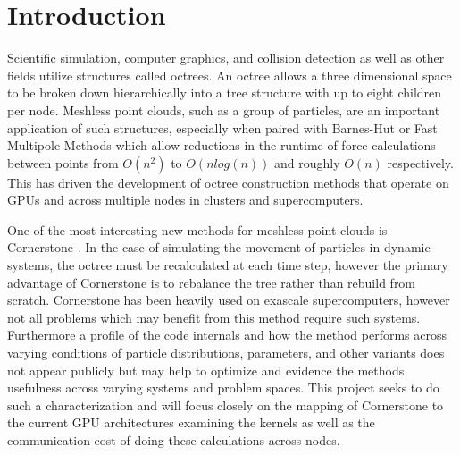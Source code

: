 \section{Introduction}
\label{sec:introduction}

Scientific simulation, computer graphics, and collision detection as well as other fields utilize structures called octrees. An octree allows a three dimensional space to be broken down hierarchically into a tree structure with up to eight children per node. Meshless point clouds, such as a group of particles, are an important application of such structures, especially when paired with Barnes-Hut or Fast Multipole Methods which allow reductions in the runtime of force calculations between points from $O(n^2)$ to $O(nlog(n))$ and roughly $O(n)$ respectively. This has driven the development of octree construction methods that operate on GPUs and across multiple nodes in clusters and supercomputers. 

One of the most interesting new methods for meshless point clouds is Cornerstone \cite{cornerstone}. In the case of simulating the movement of particles in dynamic systems, the octree must be recalculated at each time step, however the primary advantage of Cornerstone is to rebalance the tree rather than rebuild from scratch. Cornerstone has been heavily used on exascale supercomputers, however not all problems which may benefit from this method require such systems. Furthermore a profile of the code internals and how the method performs across varying conditions of particle distributions, parameters, and other variants does not appear publicly but may help to optimize and evidence the methods usefulness across varying systems and problem spaces. This project seeks to do such a characterization and will focus closely on the mapping of Cornerstone to the current GPU architectures examining the kernels as well as the communication cost of doing these calculations across nodes.
